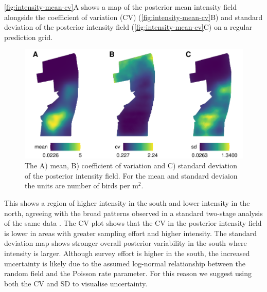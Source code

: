 \documentclass{statsoc}
\begin{document}
\autoref{fig:intensity-mean-cv}A shows a map of the posterior mean intensity field alongside the coefficient of variation (CV) (\autoref{fig:intensity-mean-cv}B) and standard deviation of the posterior intensity field (\autoref{fig:intensity-mean-cv}C) on a regular prediction grid.
\begin{figure}[!htb]
	\begin{center}
		\includegraphics[width=\textwidth]{figures/intensity_mean_cv_sd.pdf}
		\caption{The A) mean, B) coefficient of variation and C) standard deviation of the posterior intensity field.  For the mean and standard deviaion the units are number of birds per m$^2$.}
		\label{fig:intensity-mean-cv}
	\end{center}
\end{figure}
This shows a region of higher intensity in the south and lower intensity in the north, agreeing with the broad patterns observed in a standard two-stage analysis of the same data \citep{camp_dsm_2020}.  The CV plot shows that the CV in the posterior intensity field is lower in areas with greater sampling effort and higher intensity. The standard deviation map shows stronger overall posterior variability in the south where intensity is larger.  Although survey effort is higher in the south, the increased uncertainty is likely due to the assumed log-normal relationship between the random field and the Poisson rate parameter.  For this reason we suggest using both the CV and SD to visualise uncertainty.
\end{document}
